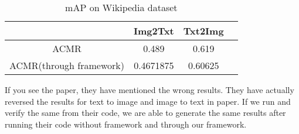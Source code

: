 \begin{table}[!h]
    \centering
    \begin{tabular}{ | c | c | c | c |}
        \hline
         & Img2Txt & Txt2Img
         \\ \hline
         ACMR\cite{ocmfh} & 0.489 & 0.619 
         \\ \hline
         ACMR(through framework) & 0.4671875 & 0.60625 
         \\ \hline

    \end{tabular}
    \caption{mAP on Wikipedia dataset}
    \label{table:}
\end{table}

If you see the paper, they have mentioned the wrong results. They have actually reversed the results for text to image and image to text in paper. If we run and verify the same from their code, we are able to generate the same results after running their code without framework and through our framework. 
